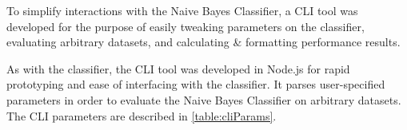 To simplify interactions with the Naive Bayes Classifier, a CLI tool was developed for the purpose of easily tweaking
parameters on the classifier, evaluating arbitrary datasets, and calculating \& formatting performance results.

As with the classifier, the CLI tool was developed in Node.js for rapid prototyping and ease of interfacing with the
classifier. It parses user-specified parameters in order to evaluate the Naive Bayes Classifier on arbitrary datasets.
The CLI parameters are described in \ref{table:cliParams}.
